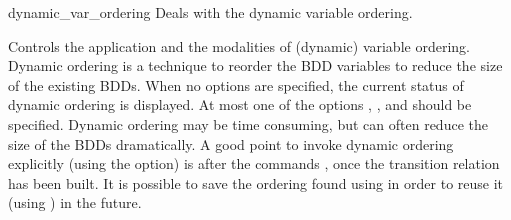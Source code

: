 \begin{nusmvCommand} {dynamic\_var\_ordering} {Deals with the dynamic variable ordering.}


Controls the application and the modalities of (dynamic) variable
ordering. Dynamic ordering is a technique to reorder the BDD variables
to reduce the size of the existing BDDs. When no options are
specified, the current status of dynamic ordering is displayed. At
most one of the options , , and
 should be specified.  Dynamic ordering may be time
consuming, but can often reduce the size of the BDDs dramatically. A
good point to invoke dynamic ordering explicitly (using the
 option) is after the commands ,
once the transition relation has been built.  It is possible to save
the ordering found using  in order to reuse it
(using ) in the future.\\

\begin{cmdOpt}


\end{cmdOpt}
\end{nusmvCommand}
